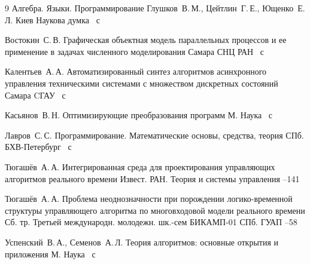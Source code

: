 \begin{thebibliography}{9}
\book Алгебра. Языки. Программирование
\by Глушков~В.\,М.,  Цейтлин~Г.\,Е.,  Ющенко~Е.\,Л.
\publaddr Киев
\publ Наукова думка
~с

\by Востокин~С.\,В.
\book Графическая объектная модель параллельных процессов и ее применение в задачах численного моделирования
\publaddr Самара
\publ СНЦ РАН
~с


\by  Калентьев~А.\,А.
\book Автоматизированный синтез алгоритмов асинхронного управления техническими системами с множеством дискретных состояний
\publaddr Самара
\publ CГАУ
~с


\by   Касьянов~В.\,Н.
\book Оптимизирующие преобразования программ
\publaddr М.
\publ Наука
~с


\by    Лавров~С.\,С.
\book Программирование. Математические основы,  средства,  теория
\publaddr СПб.
\publ БХВ-Петербург
~с

\by Тюгашёв~А.\,А.
\paper Интегрированная среда для проектирования управляющих алгоритмов реального времени
\jour Извест. РАН. Теория и системы управления
--141

\by Тюгашёв~А.\,А.
\paper Проблема неоднозначности при порождении логико-временной структуры управляющего алгоритма по многовходовой модели реального времени
\bookinfo Сб. тр. Третьей международн. молодежн. шк.-сем \inbook БИКАМП-01
\publaddr СПб.
\publ ГУАП
--58

\by Успенский~В.\,А.,  Семенов~А.\,Л.
\book  Теория алгоритмов: основные открытия и приложения
\publaddr М.
\publ Наука
~с
\end{thebibliography}

\makeengtitlem
\lfoot[\thepage]{}
\rfoot[]{\thepage}


% 
